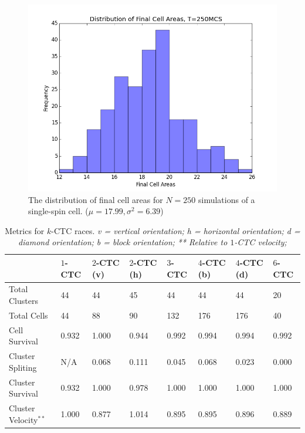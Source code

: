 \documentclass[12pt]{article}
\begin{document}
\begin{figure}[h]
	\centering
	\includegraphics[scale=0.5]{img/cellareas}
	\caption{The distribution of final cell areas for $N=250$ simulations of a single-spin cell. ($\mu = 17.99, \sigma^2=6.39$) }
	\label{cellareas}
\end{figure}


\begin{table}[h]
    \begin{tabular}{|l|l|l|l|l|l|l|l|}
    \hline
    ~                & $1$-CTC   & $2$-CTC (v) & $2$-CTC (h) & $3$-CTC & $4$-CTC (b) & $4$-CTC (d) & $6$-CTC \\ \hline
    Total Clusters   & 44  & 44  & 45  & 44 & 44 & 44 & 20  \\ \hline
    Total Cells 		 & 44 & 88 & 90 & 132 & 176 & 176 & 40 \\ \hline
    Cell Survival    & 0.932  & 1.000 & 0.944 & 0.992 & 0.994 & 0.994 & 0.992 \\ \hline
    Cluster Spliting & N/A & 0.068 & 0.111 & 0.045 & 0.068 & 0.023 & 0.000 \\ \hline
    Cluster Survival & 0.932 & 1.000 & 0.978 & 1.000 & 1.000 & 1.000 & 1.000 \\ \hline
    Cluster Velocity$^{**}$ & 1.000  & 0.877 & 1.014 & 0.895  & 0.895 & 0.896 & 0.889 \\ \hline
    \end{tabular}
    \caption{Metrics for $k$-CTC races.
    \emph{ v = vertical orientation; }
    \emph{ h = horizontal orientation; }
    \emph{ d = diamond orientation; }
    \emph{ b = block orientation; }
    \emph{** Relative to $1$-CTC velocity; }}
    \label{racestats}
\end{table}
\end{document}
